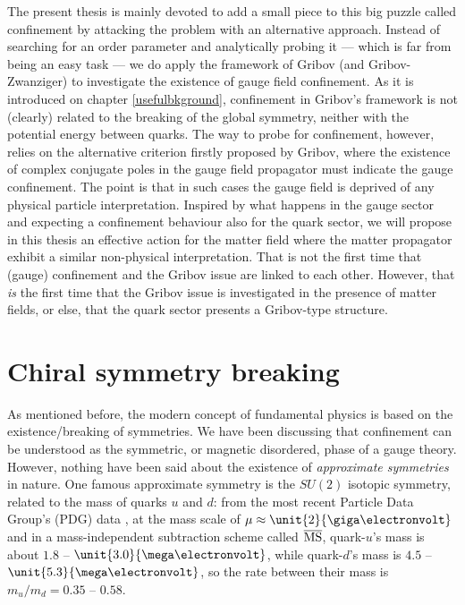The present thesis is mainly devoted to add a small piece to this big puzzle called confinement
by attacking the problem with an alternative approach. Instead of searching for an order
parameter and analytically probing it --- which is far from being an easy task
--- we do apply the framework of Gribov (and Gribov-Zwanziger) to investigate the existence of
gauge field confinement. As it is introduced on chapter \ref{usefulbkground},
confinement in Gribov's framework is not (clearly) related to the breaking of the global
symmetry, neither with the potential energy between quarks. The way to probe for confinement,
however, relies on the alternative criterion firstly proposed by Gribov, where the existence of
complex conjugate poles in the gauge field propagator must indicate the gauge confinement. The
point is that in such cases the gauge field is deprived of any physical particle
interpretation. Inspired by what happens in the gauge sector and expecting a confinement
behaviour also for the quark sector, we will propose in this thesis an effective action for the
matter field where the matter propagator exhibit a similar non-physical interpretation. That is
not the first time that (gauge) confinement and the Gribov issue are linked to each other.
However, that {\it is} the first time that the Gribov issue is investigated in the presence of
matter fields, or else, that the quark sector presents a Gribov-type structure.


\section{Chiral symmetry breaking}

As mentioned before, the modern concept of fundamental physics is based on the
existence/break\-ing of symmetries. We have been discussing that confinement can be understood
as the symmetric, or magnetic disordered, phase of a gauge theory. However, nothing have been
said about the existence of \emph{approximate symmetries} in nature. One famous approximate
symmetry is the $SU(2)$ isotopic symmetry, related to the mass of quarks $u$ and $d$: from the
most recent Particle Data Group's (PDG) data \cite{Agashe:2014kda}, at the mass scale of
$\mu \approx \unit{2}{\giga\electronvolt}$ and in a
mass-independent subtraction scheme called $\overline{\mbox{MS}}$, quark-$u$'s mass is about $1.8$ --
$\unit{3.0}{\mega\electronvolt}$, while quark-$d$'s mass is $4.5$ --
$\unit{5.3}{\mega\electronvolt}$, so the rate between their mass is $m_{u}/m_{d} = 0.35$ --
$0.58$. 


